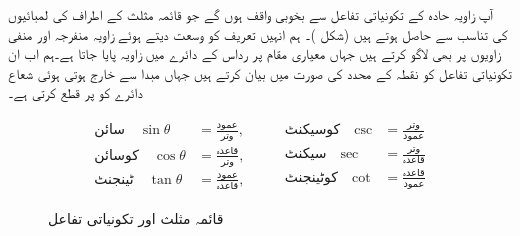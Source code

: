 آپ  زاویہ حادہ کے تکونیاتی تفاعل سے بخوبی واقف ہوں گے جو قائمہ مثلث کے اطراف کی لمبائیوں کی تناسب سے حاصل ہوتے ہیں (شکل )۔ ہم انہیں تعریف کو وسعت دیتے ہوئے  زاویہ منفرجہ اور منفی زاویوں پر بھی لاگو کرتے ہیں جہاں معیاری مقام پر رداس  کے دائرے میں زاویہ پایا جاتا ہے۔ہم اب ان تکونیاتی تفاعل کو نقطہ  کے محدد کی صورت میں بیان کرتے ہیں جہاں مبدا سے خارج ہوتی ہوئی شعاع دائرے کو  پر قطع کرتی  ہے۔
\begin{figure}
\centering
\begin{minipage}[b][][b]{0.3\textwidth}
\centering
{}
\end{minipage}\hfill
\begin{minipage}[b][][b]{0.66\textwidth}
\begin{gather*}
\begin{aligned}
\text{سائن}\quad \sin \theta&=\tfrac{\text{عمود}}{\text{وتر}},\\
\text{کوسائن}\quad\cos \theta&=\tfrac{\text{قاعدہ}}{\text{وتر}},\\
\text{ٹینجنٹ}\quad \tan \theta&=\tfrac{\text{عمود}}{\text{قاعدہ}},
\end{aligned}\quad\quad
\begin{aligned}
\text{کوسیکنٹ}\quad\csc&=\tfrac{\text{وتر}}{\text{عمود}}\\
\text{سیکنٹ}\quad\sec&=\tfrac{\text{وتر}}{\text{قاعدہ}}\\
\text{کوٹینجنٹ}\quad\cot&=\tfrac{\text{قاعدہ}}{\text{عمود}}
\end{aligned}
\end{gather*}
\end{minipage}%
\caption{قائمہ مثلث اور تکونیاتی تفاعل}
\label{شکل_ابتدا_قائمہ_مثلث}
\end{figure}

